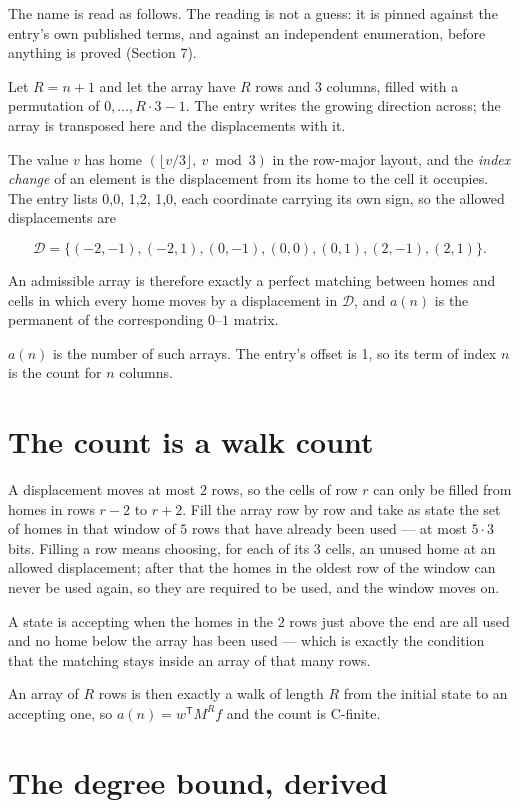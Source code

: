 \documentclass[11pt]{article}
\theoremstyle{definition}
\begin{document}
The name is read as follows. The reading is not a guess: it is pinned against the entry's own published terms, and against an independent enumeration, before anything is proved (Section 7).

Let $R = n + 1$ and let the array have $R$ rows and $3$ columns, filled with a permutation of $0,\dots,R\cdot3-1$. The entry writes the growing direction across; the array is transposed here and the displacements with it.

The value $v$ has home $(\lfloor v/3\rfloor,\ v \bmod 3)$ in the row-major layout, and the {\itshape index change} of an element is the displacement from its home to the cell it occupies. The entry lists 0,0, 1,2, 1,0, each coordinate carrying its own sign, so the allowed displacements are

\[\mathcal{D} = \{(-2,-1), (-2,1), (0,-1), (0,0), (0,1), (2,-1), (2,1)\}.\]

An admissible array is therefore exactly a perfect matching between homes and cells in which every home moves by a displacement in $\mathcal{D}$, and $a(n)$ is the permanent of the corresponding $0$--$1$ matrix.

$a(n)$ is the number of such arrays. The entry's offset is 1, so its term of index $n$ is the count for $n$ columns.

\section{The count is a walk count}

A displacement moves at most $2$ rows, so the cells of row $r$ can only be filled from homes in rows $r-2$ to $r+2$. Fill the array row by row and take as state the set of homes in that window of $5$ rows that have already been used --- at most $5\cdot3$ bits. Filling a row means choosing, for each of its $3$ cells, an unused home at an allowed displacement; after that the homes in the oldest row of the window can never be used again, so they are required to be used, and the window moves on.

A state is accepting when the homes in the $2$ rows just above the end are all used and no home below the array has been used --- which is exactly the condition that the matching stays inside an array of that many rows.

An array of $R$ rows is then exactly a walk of length $R$ from the initial state to an accepting one, so $a(n) = w^{\mathsf T}M^{R}f$ and the count is C-finite.

\section{The degree bound, derived}
\end{document}
